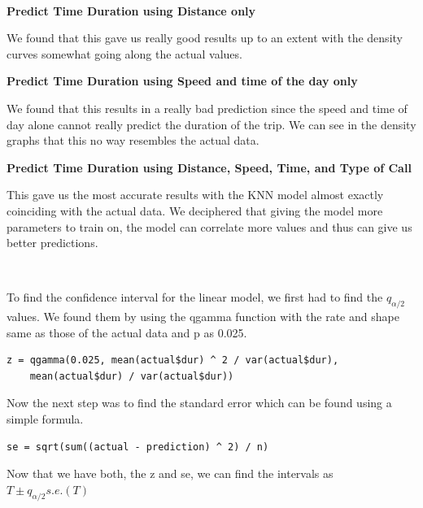 \documentclass[11pt]{article}
\begin{document}
\\
\par
\textbf{Predict Time Duration using Distance only}
\par
We found that this gave us really good results up to an extent with the density curves somewhat going along the actual values.

\textbf{Predict Time Duration using Speed and time of the day only}
\par
We found that this results in a really bad prediction since the speed and time of day alone cannot really predict the duration of the trip. We can see in the density graphs that this no way resembles the actual data.

\textbf{Predict Time Duration using Distance, Speed, Time, and Type of Call}
\par
This gave us the most accurate results with the KNN model almost exactly coinciding with the actual data. We deciphered that giving the model more parameters to train on, the model can correlate more values and thus can give us better predictions.

\\
\par
To find the confidence interval for the linear model, we first had to find the $q_{\alpha/2}$ values. We found them by using the qgamma function with the rate and shape same as those of the actual data and p as 0.025.
\begin{lstlisting}
z = qgamma(0.025, mean(actual$dur) ^ 2 / var(actual$dur), 
    mean(actual$dur) / var(actual$dur))
\end{lstlisting}
\par
Now the next step was to find the standard error which can be found using a simple formula.
\begin{lstlisting}
se = sqrt(sum((actual - prediction) ^ 2) / n)
\end{lstlisting}
Now that we have both, the z and se, we can find the intervals as $T \pm q_{\alpha/2} s.e.(T)$
\end{document}
